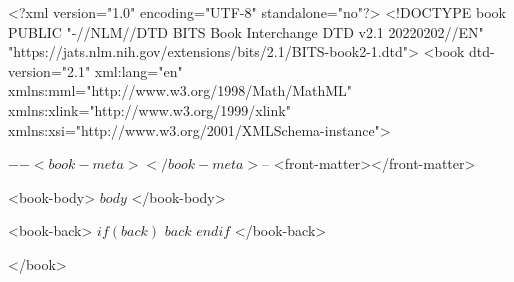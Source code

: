 <?xml version="1.0" encoding="UTF-8" standalone="no"?>
<!DOCTYPE book PUBLIC "-//NLM//DTD BITS Book Interchange DTD v2.1 20220202//EN" "https://jats.nlm.nih.gov/extensions/bits/2.1/BITS-book2-1.dtd">
<book
dtd-version="2.1" xml:lang="en" 
xmlns:mml="http://www.w3.org/1998/Math/MathML" 
xmlns:xlink="http://www.w3.org/1999/xlink" 
xmlns:xsi="http://www.w3.org/2001/XMLSchema-instance">

$-- <book-meta></book-meta>
$-- <front-matter></front-matter>

<book-body>
$body$
</book-body>

<book-back>
$if(back)$
$back$
$endif$
</book-back>

</book>